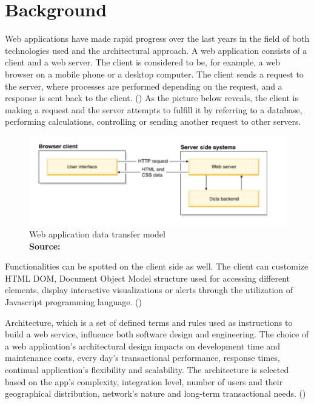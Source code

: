 
\chapter{Background} %

\label{Chapter2} %

Web applications have made rapid progress over the last years in the field of both technologies used and the architectural approach. A web application consists of a client and a web server. The client is considered to be, for example, a web browser on a mobile phone or a desktop computer. The client sends a request to the server, where processes are performed depending on the request, and a response is sent back to the client. (\cite{Reference6}) As the picture below reveals, the client is making a request and the server attempts to fulfill it by referring to a database, performing calculations, controlling or sending another request to other servers. \par

\begin{figure}[h!]
	\begin{center}
		\includegraphics[scale=0.8]{images/web_structure.png}
	\end{center}
	\caption{
		Web application data transfer model
		\\
		\textbf{Source:} \cite{Reference6}
	}
\end{figure}

Functionalities can be spotted on the client side as well. The client can customize HTML DOM, Document Object Model structure used for accessing different elements, display interactive visualizations or alerts through the utilization of Javascript programming language. (\cite{Reference6}) \par

Architecture, which is a set of defined terms and rules used as instructions to build a web service, influence both software design and engineering. The choice of a web application's architectural design impacts on development time and maintenance costs, every day's transactional performance, response times, continual application's flexibility and scalability. The architecture is selected based on the app's complexity, integration level, number of users and their geographical distribution, network's nature and long-term transactional needs. (\cite{Reference1})\par

